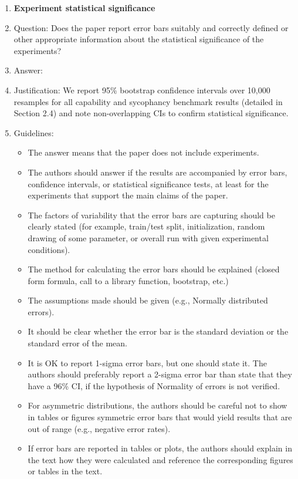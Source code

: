 \documentclass{article}
\begin{document}
\begin{enumerate}
\item {\bf Experiment statistical significance}
    \item[] Question: Does the paper report error bars suitably and correctly defined or other appropriate information about the statistical significance of the experiments?
    \item[] Answer: \answerYes{}
    \item[] Justification: We report 95\% bootstrap confidence intervals over 10,000 resamples for all capability and sycophancy benchmark results (detailed in Section 2.4) and note non-overlapping CIs to confirm statistical significance.
    \item[] Guidelines:
    \begin{itemize}
        \item The answer \answerNA{} means that the paper does not include experiments.
        \item The authors should answer \answerYes{} if the results are accompanied by error bars, confidence intervals, or statistical significance tests, at least for the experiments that support the main claims of the paper.
        \item The factors of variability that the error bars are capturing should be clearly stated (for example, train/test split, initialization, random drawing of some parameter, or overall run with given experimental conditions).
        \item The method for calculating the error bars should be explained (closed form formula, call to a library function, bootstrap, etc.)
        \item The assumptions made should be given (e.g., Normally distributed errors).
        \item It should be clear whether the error bar is the standard deviation or the standard error of the mean.
        \item It is OK to report 1-sigma error bars, but one should state it. The authors should preferably report a 2-sigma error bar than state that they have a 96\% CI, if the hypothesis of Normality of errors is not verified.
        \item For asymmetric distributions, the authors should be careful not to show in tables or figures symmetric error bars that would yield results that are out of range (e.g., negative error rates).
        \item If error bars are reported in tables or plots, the authors should explain in the text how they were calculated and reference the corresponding figures or tables in the text.
    \end{itemize}


\end{enumerate}
\end{document}
